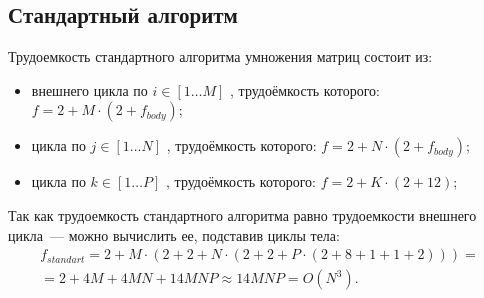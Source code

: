 \subsection*{Стандартный алгоритм}
Трудоемкость стандартного алгоритма умножения матриц состоит из:
\begin{itemize}
	\item внешнего цикла по $i \in [1 \ldots M]$ , трудоёмкость которого: $f = 2 + M \cdot (2 + f_{body})$;
	\item цикла по $j \in [1 \ldots N]$ , трудоёмкость которого: $f = 2 + N \cdot (2 + f_{body})$;
	\item цикла по $k \in [1 \ldots P]$ , трудоёмкость которого: $f = 2 + K \cdot (2 + 12)$;
\end{itemize}
Так как трудоемкость стандартного алгоритма равно трудоемкости внешнего цикла~--- можно вычислить ее, подставив циклы тела:
\begin{equation}
	\begin{gathered}
		f_{standart} = 2 + M \cdot (2 + 2 + N \cdot (2 + 2 + P \cdot (2 + 8 + 1 + 1 + 2))) = \\
		= 2 + 4M + 4MN + 14MNP \approx 14MNP = O(N^3).
	\end{gathered}
\end{equation}

